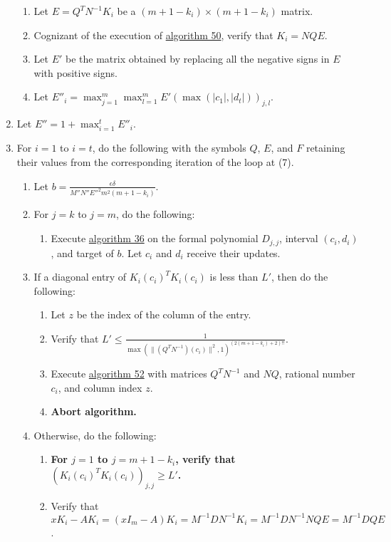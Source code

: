 \documentclass[twocolumn]{article}
\begin{document}
\begin{enumerate}
\begin{enumerate}
					\item Let $E=Q^TN^{-1}K_i$ be a $(m+1-k_i)\times(m+1-k_i)$ matrix.
					\item Cognizant of the execution of \hyperref[sec:algorithm 50]{algorithm 50}, verify that $K_i=NQE$.
					\item Let $E'$ be the matrix obtained by replacing all the negative signs in $E$ with positive signs.
					\item Let $E''_i=\max_{j=1}^m\max_{l=1}^mE'(\max(\lvert c_1\rvert,\lvert d_t\rvert))_{j,l}$.
				\end{enumerate}
				\item Let $E''=1+\max_{i=1}^t E''_i$.
				\item For $i=1$ to $i=t$, do the following with the symbols $Q$, $E$, and $F$ retaining their values from the corresponding iteration of the loop at (7).
				\begin{enumerate}
					\item Let $b=\frac{\epsilon\delta}{M''N''E''^2m^2(m+1-k_i)}$.
					\item For $j=k$ to $j=m$, do the following:
					\begin{enumerate}
						\item Execute \hyperref[sec:algorithm 36]{algorithm 36} on the formal polynomial $D_{j,j}$, interval $(c_i, d_i)$, and target of $b$. Let $c_i$ and $d_i$ receive their updates.
					\end{enumerate}
					\item If a diagonal entry of ${K_i(c_i)}^TK_i(c_i)$ is less than $L'$, then do the following:
					\begin{enumerate}
						\item Let $z$ be the index of the column of the entry.
						\item Verify that $L'\le\frac{1}{\max(\lVert (Q^TN^{-1})(c_i)\rVert^2,1)^{(2(m+1-k_i)+2)!!}}$.
						\item Execute \hyperref[sec:algorithm 52]{algorithm 52} with matrices $Q^TN^{-1}$ and $NQ$, rational number $c_i$, and column index $z$.
						\item \textbf{Abort algorithm.}
					\end{enumerate}
					\item Otherwise, do the following:
					\begin{enumerate}
						\item \textbf{For $j=1$ to $j=m+1-k_i$, verify that $({K_i(c_i)}^TK_i(c_i))_{j,j}\ge L'$.}
						\item Verify that $xK_i-AK_i=(xI_m-A)K_i=M^{-1}DN^{-1}K_i=M^{-1}DN^{-1}NQE=M^{-1}DQE$.

\end{enumerate}
\end{enumerate}
\end{enumerate}
\end{document}
